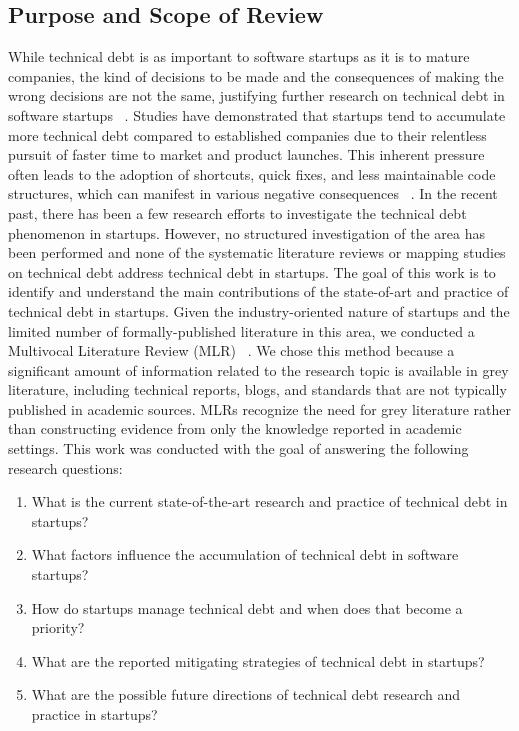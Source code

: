 \subsection{Purpose and Scope of Review}
While technical debt is as important to software startups as it is to mature companies, the kind of decisions to be made and the consequences of making the wrong decisions are not the same, justifying further research on technical debt in software startups ~\cite{Unterkalmsteiner16}. Studies have demonstrated that startups tend to accumulate more technical debt compared to established companies due to their relentless pursuit of faster time to market and product launches. This inherent pressure often leads to the adoption of shortcuts, quick fixes, and less maintainable code structures, which can manifest in various negative consequences ~\cite{Giardino2016,Klotins882019}. In the recent past, there has been a few research efforts to investigate the technical debt phenomenon in startups. However, no structured investigation of the area has been performed and none of the systematic literature reviews or mapping studies on technical debt address technical debt in startups. The goal of this work is to identify and understand the main contributions of the state-of-art and practice of technical debt in startups. Given the industry-oriented nature of startups and the limited number of formally-published literature in this area, we conducted a Multivocal Literature Review (MLR) ~\cite{GAROUSI2019101}. We chose this method because a significant amount of information related to the research topic is available in grey literature, including technical reports, blogs, and standards that are not typically published in academic sources. MLRs recognize the need for grey literature rather than constructing evidence from only the knowledge reported in academic settings.
This work was conducted with the goal of answering the following research questions:
\begin{enumerate}
\item What is the current state-of-the-art research and practice of technical debt in startups?
\item {What factors influence the accumulation of technical debt in software startups?}
\item {How do startups manage technical debt and when does that become a priority?}
\item What are the reported mitigating strategies of technical debt in startups?
\item What are the possible future directions of technical debt research and practice in startups?
\end{enumerate}

